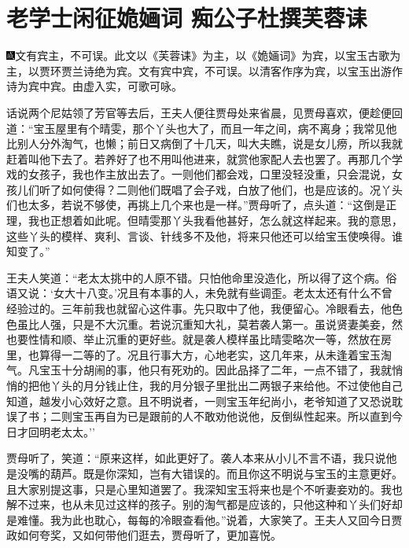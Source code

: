 
\chapter{老学士闲征姽婳词 痴公子杜撰芙蓉诔}
{\includegraphics[width=3mm]{../Images/00005}\kaishu 文有宾主，不可误。此文以《芙蓉诔》为主，以《}姽婳{\kaishu 词》为宾，以宝玉古歌为主，以贾环贾兰诗绝为宾。文有宾中宾，不可误。以清客作序为宾，以宝玉出游作诗为宾中宾。由虚入实，可歌可咏。}

话说两个尼姑领了芳官等去后，王夫人便往贾母处来省晨，见贾母喜欢，便趁便回道：``宝玉屋里有个晴雯，那个丫头也大了，而且一年之间，病不离身；我常见他比别人分外淘气，也懒；前日又病倒了十几天，叫大夫瞧，说是女儿痨，所以我就赶着叫他下去了。若养好了也不用叫他进来，就赏他家配人去也罢了。再那几个学戏的女孩子，我也作主放出去了。一则他们都会戏，口里没轻没重，只会混说，女孩儿们听了如何使得？二则他们既唱了会子戏，白放了他们，也是应该的。况丫头们也太多，若说不够使，再挑上几个来也是一样。''贾母听了，点头道：``这倒是正理，我也正想着如此呢。但晴雯那丫头我看他甚好，怎么就这样起来。我的意思，这些丫头的模样、爽利、言谈、针线多不及他，将来只他还可以给宝玉使唤得。谁知变了。''

王夫人笑道：``老太太挑中的人原不错。只怕他命里没造化，所以得了这个病。俗语又说：`女大十八变。'况且有本事的人，未免就有些调歪。老太太还有什么不曾经验过的。三年前我也就留心这件事。先只取中了他，我便留心。冷眼看去，他色色虽比人强，只是不大沉重。若说沉重知大礼，莫若袭人第一。虽说贤妻美妾，然也要性情和顺、举止沉重的更好些。就是袭人模样虽比晴雯略次一等，然放在房里，也算得一二等的了。况且行事大方，心地老实，这几年来，从未逢着宝玉淘气。凡宝玉十分胡闹的事，他只有死劝的。因此品择了二年，一点不错了，我就悄悄的把他丫头的月分钱止住，我的月分银子里批出二两银子来给他。不过使他自己知道，越发小心效好之意。且不明说者，一则宝玉年纪尚小，老爷知道了又恐说耽误了书；二则宝玉再自为已是跟前的人不敢劝他说他，反倒纵性起来。所以直到今日才回明老太太。''

贾母听了，笑道：``原来这样，如此更好了。袭人本来从小儿不言不语，我只说他是没嘴的葫芦。既是你深知，岂有大错误的。而且你这不明说与宝玉的主意更好。且大家别提这事，只是心里知道罢了。我深知宝玉将来也是个不听妻妾劝的。我也解不过来，也从未见过这样的孩子。别的淘气都是应该的，只他这种和丫头们好却是难懂。我为此也耽心，每每的冷眼查看他。''说着，大家笑了。王夫人又回今日贾政如何夸奖，又如何带他们逛去，贾母听了，更加喜悦。

